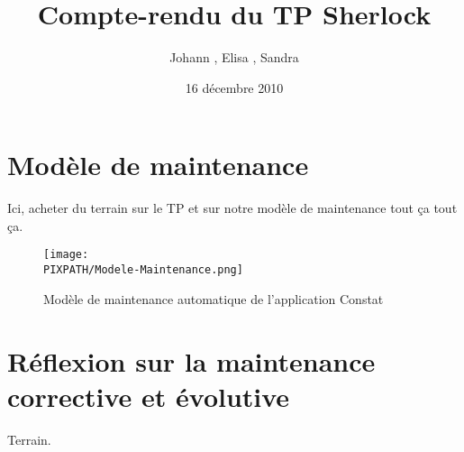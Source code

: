 \documentclass[a4paper]{article}
\title{\vfill \textbf{Compte-rendu du TP Sherlock}}
\author{Johann \bsc{Chazelle}, Elisa \bsc{Abidh}, Sandra \bsc{Mondain}}
\date{16 décembre 2010\vfill}
\newcommand\PIXPATH{../ressources}
\begin{document}
\maketitle

\newpage

\section{Modèle de maintenance}
Ici, acheter du terrain sur le TP et sur notre modèle de maintenance tout ça tout ça. 
\begin{figure}[!h]
\begin{center}
        \texttt{[image: \\PIXPATH/Modele-Maintenance.png]}
        \caption{Modèle de maintenance automatique de l'application Constat}
\end{center}
\end{figure}

\section{Réflexion sur la maintenance corrective et évolutive}
Terrain. 
\end{document}
